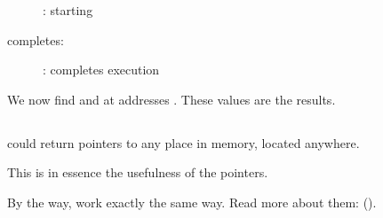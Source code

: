 \begin{figure}[H]
\centering
{}
\caption{\olly: \ttfone starting}
\label{fig:pointers_olly_stk_2}
\end{figure}

\clearpage
\ttfone completes:

\begin{figure}[H]
\centering
{}
\caption{\olly: \ttfone completes execution}
\label{fig:pointers_olly_stk_3}
\end{figure}

We now find  and  at addresses \PtrsAddresses.
These values are the \ttfone results.

\subsection{\Conclusion{}}
 
\ttfone could return pointers to any place in memory, located anywhere.

This is in essence the usefulness of the pointers.

By the way, \Cpp {} work exactly the
same way. Read more about them: ().
